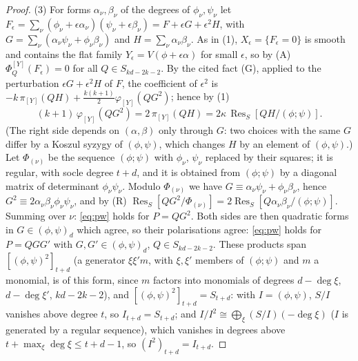 \documentclass[11pt]{article}
\numberwithin{equation}{section}
\theoremstyle{remark}
\newcommand{\Res}{\operatorname{Res}}
\begin{document}
\begin{proof}
(3) For forms $\alpha_\nu,\beta_\nu$ of the degrees of $\phi_\nu,\psi_\nu$ let
$F_\epsilon=\sum_\nu(\phi_\nu+\epsilon \alpha_\nu)(\psi_\nu+\epsilon \beta_\nu)=F+\epsilon G+\epsilon^2H$, with
$G=\sum_\nu(\alpha_\nu\psi_\nu+\phi_\nu \beta_\nu)$ and $H=\sum_\nu \alpha_\nu \beta_\nu$. As in (1), $X_\epsilon=\{F_\epsilon=0\}$ is
smooth and contains the flat family $Y_\epsilon=V(\phi+\epsilon\alpha)$ for small $\epsilon$, so by (A)
$\Phi^{[Y]}_Q(F_\epsilon)=0$ for all $Q\in S_{kd-2k-2}$. By the cited fact (G), applied to the perturbation $\epsilon G+\epsilon^2H$ of $F$, the
coefficient of $\epsilon^2$ is $-k\,\pi_{[Y]}(QH)+\frac{k(k+1)}2\varphi_{[Y]}(QG^2)$; hence by (1)
\[
(k+1)\,\varphi_{[Y]}(QG^2)=2\,\pi_{[Y]}(QH)=2\kappa\,\Res_S[QH/(\phi;\psi)].
\]
(The right side depends on $(\alpha,\beta)$ only through $G$: two choices with the same $G$ differ by a Koszul
syzygy of $(\phi,\psi)$, which changes $H$ by an element of $(\phi,\psi)$.)
Let $\Phi_{(\nu)}$ be the sequence $(\phi;\psi)$ with $\phi_\nu$, $\psi_\nu$ replaced by their squares; it is
regular, with socle degree $t+d$, and it is obtained from $(\phi;\psi)$ by a diagonal matrix of determinant
$\phi_\nu\psi_\nu$. Modulo $\Phi_{(\nu)}$ we have $G\equiv \alpha_\nu\psi_\nu+\phi_\nu \beta_\nu$, hence
$G^2\equiv2\alpha_\nu \beta_\nu\phi_\nu\psi_\nu$, and by (R)
$\Res_S[QG^2/\Phi_{(\nu)}]=2\Res_S[Q\alpha_\nu \beta_\nu/(\phi;\psi)]$. Summing over $\nu$: \eqref{eq:pw} holds for
$P=QG^2$. Both sides are then quadratic forms in $G\in(\phi,\psi)_d$ which agree, so their polarisations agree:
\eqref{eq:pw} holds for $P=QGG'$ with $G,G'\in(\phi,\psi)_d$, $Q\in S_{kd-2k-2}$. These products span
$[(\phi,\psi)^2]_{t+d}$ (a generator $\xi\xi'm$, with $\xi,\xi'$ members of $(\phi;\psi)$ and $m$ a monomial, is of
this form, since $m$ factors into monomials of degrees $d-\deg\xi$, $d-\deg\xi'$, $kd-2k-2$), and
$[(\phi,\psi)^2]_{t+d}=S_{t+d}$: with $I=(\phi,\psi)$, $S/I$ vanishes above degree $t$, so $I_{t+d}=S_{t+d}$; and
$I/I^2\cong\bigoplus_\xi(S/I)(-\deg\xi)$ ($I$ is generated by a regular sequence), which vanishes in degrees
above $t+\max_\xi\deg\xi\le t+d-1$, so $(I^2)_{t+d}=I_{t+d}$.


\end{proof}
\end{document}
